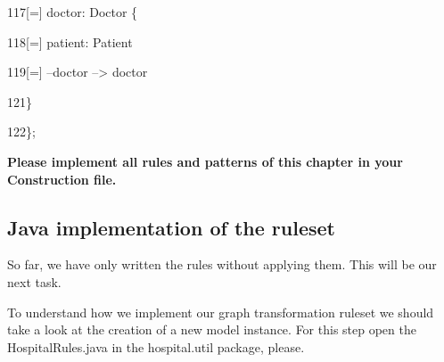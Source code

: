 {{117\hspace{1cm}[=] doctor: Doctor \{

118\hspace{1cm}[=] patient: Patient {}

119\hspace{1.5cm}[=] --doctor --> doctor

121\hspace{1cm}\}

122\hspace{0.5cm}\};\newline\newline

}

\textbf{Please implement all rules and patterns of this chapter in your Construction file.}\newline\clearpage

\subsection{Java implementation of the ruleset}

So far, we have only written the rules without applying them. This will be our next task.

To understand how we implement our graph transformation ruleset we should take a look at the creation of a new model instance. For this step open the \textsf{HospitalRules.java} in the \textsf{hospital.util package}, please.\newline








}
